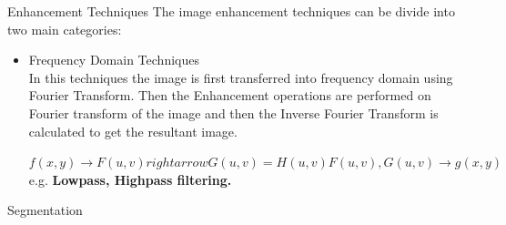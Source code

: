\documentclass[12pt]{beamer}
\begin{document}
\begin{frame}{Enhancement Techniques}
\large The image enhancement techniques can be divide into two main categories:
\normalsize
{}
 {
\begin{itemize}
\item<2> Frequency Domain Techniques \\
In this techniques the image is first transferred into frequency domain using Fourier Transform. Then the Enhancement operations are performed on Fourier transform of the image and then the Inverse Fourier Transform is calculated to get the resultant image.

$f(x,y) \rightarrow F(u,v) rightarrow G(u,v) = H(u,v)F(u,v), G(u,v) \rightarrow g(x,y) $ \\
e.g. \textbf{Lowpass, Highpass filtering.}
\end{itemize}
}
\end{frame}
\begin{frame}{Segmentation}

\end{frame}
\end{document}

